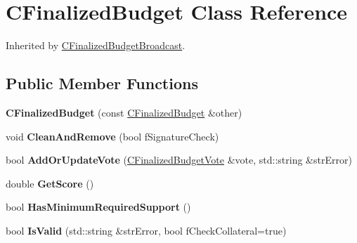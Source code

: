 \hypertarget{class_c_finalized_budget}{}\section{C\+Finalized\+Budget Class Reference}
\label{class_c_finalized_budget}


Inherited by \mbox{\hyperlink{class_c_finalized_budget_broadcast}{C\+Finalized\+Budget\+Broadcast}}.

\subsection*{Public Member Functions}
\begin{DoxyCompactItemize}
\item 
\mbox{\label{class_c_finalized_budget_a701687a3f6f5dadaa8cf20b188306005}} 
{\bfseries C\+Finalized\+Budget} (const \mbox{\hyperlink{class_c_finalized_budget}{C\+Finalized\+Budget}} \&other)
\item 
\mbox{\label{class_c_finalized_budget_a11cbbc4f8f84e5ffb2b7257168da98be}} 
void {\bfseries Clean\+And\+Remove} (bool f\+Signature\+Check)
\item 
\mbox{\label{class_c_finalized_budget_a63fadb286f5d0f9f735bc33deba56b02}} 
bool {\bfseries Add\+Or\+Update\+Vote} (\mbox{\hyperlink{class_c_finalized_budget_vote}{C\+Finalized\+Budget\+Vote}} \&vote, std\+::string \&str\+Error)
\item 
\mbox{\label{class_c_finalized_budget_aadcaaf7b39cfe0400253db00c5fe0b03}} 
double {\bfseries Get\+Score} ()
\item 
\mbox{\label{class_c_finalized_budget_a96b19202f64cb941239a500e7895c048}} 
bool {\bfseries Has\+Minimum\+Required\+Support} ()
\item 
\mbox{\label{class_c_finalized_budget_ae91a3b63f88979a2cf5252b91b9f339d}} 
bool {\bfseries Is\+Valid} (std\+::string \&str\+Error, bool f\+Check\+Collateral=true)
\item 
\mbox{\label{class_c_finalized_budget_adc46e6b0931fd6335d0788311886a1ba}} 

\end{DoxyCompactItemize}
